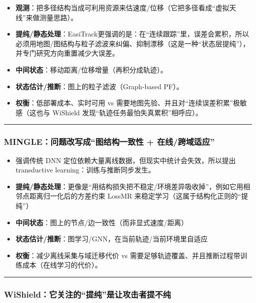 \documentclass[
]{article}
\begin{document}
\begin{itemize}
\item
  \textbf{观测}：把多径结构当成可利用资源来估速度/位移（它把多径看成``虚拟天线''来做测量思路）。
\item
  \textbf{提纯/静态处理}：EasiTrack更强调的是：在``连续跟踪''里，误差会累积，所以必须用地图/图结构与粒子滤波来纠偏、抑制漂移（这是一种``状态层提纯''），并专门研究方向重置减少大误差。
\item
  \textbf{中间状态}：移动距离/位移增量（再积分成轨迹）。
\item
  \textbf{状态估计/推断}：图上的粒子滤波（Graph-based PF）。
\item
  \textbf{权衡}：低部署成本、实时可用 vs
  需要地图先验、并且对``连续误差积累''极敏感（这也与 WiShield
  发现``轨迹任务最怕失真累积''相呼应）。
\end{itemize}

\begin{center}\rule{0.5\linewidth}{0.5pt}\end{center}

\subsubsection{MINGLE：问题改写成``图结构一致性 +
在线/跨域适应''}\label{mingleux95eeux9898ux6539ux5199ux6210ux56feux7ed3ux6784ux4e00ux81f4ux6027--ux5728ux7ebfux8de8ux57dfux9002ux5e94}

\begin{itemize}
\item
  强调传统 DNN 定位依赖大量离线数据，但现实中统计会失效，所以提出
  transductive learning：训练与推断同步发生。
\item
  \textbf{提纯/静态处理}：更像是``用结构损失把不稳定/环境差异吸收掉''，例如它用相邻点距离归一化后的方差约束
  LossMR 来稳定学习（这属于结构化正则的``提纯''）
\item
  \textbf{中间状态}：图上的节点/边一致性（而非显式速度/距离）
\item
  \textbf{状态估计/推断}：图学习/GNN，在当前轨迹/当前环境里自适应
\item
  \textbf{权衡}：减少离线采集与域迁移代价 vs
  需要足够轨迹覆盖、并且推断过程带训练成本（在线学习的代价）。
\end{itemize}

\begin{center}\rule{0.5\linewidth}{0.5pt}\end{center}

\subsubsection{WiShield：它关注的``提纯''是让攻击者提不纯}\label{wishieldux5b83ux5173ux6ce8ux7684ux63d0ux7eafux662fux8ba9ux653bux51fbux8005ux63d0ux4e0dux7eaf}
\end{document}
